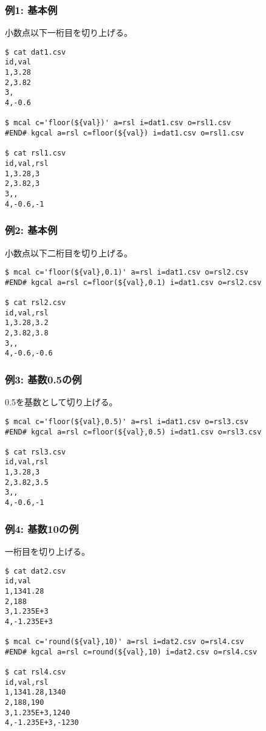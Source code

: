 
\subsubsection*{例1: 基本例}

小数点以下一桁目を切り上げる。

\begin{Verbatim}[baselinestretch=0.7,frame=single]
$ cat dat1.csv
id,val
1,3.28
2,3.82
3,
4,-0.6

$ mcal c='floor(${val})' a=rsl i=dat1.csv o=rsl1.csv
#END# kgcal a=rsl c=floor(${val}) i=dat1.csv o=rsl1.csv

$ cat rsl1.csv
id,val,rsl
1,3.28,3
2,3.82,3
3,,
4,-0.6,-1
\end{Verbatim}

\subsubsection*{例2: 基本例}

小数点以下二桁目を切り上げる。

\begin{Verbatim}[baselinestretch=0.7,frame=single]
$ mcal c='floor(${val},0.1)' a=rsl i=dat1.csv o=rsl2.csv
#END# kgcal a=rsl c=floor(${val},0.1) i=dat1.csv o=rsl2.csv

$ cat rsl2.csv
id,val,rsl
1,3.28,3.2
2,3.82,3.8
3,,
4,-0.6,-0.6
\end{Verbatim}

\subsubsection*{例3: 基数0.5の例}

0.5を基数として切り上げる。

\begin{Verbatim}[baselinestretch=0.7,frame=single]
$ mcal c='floor(${val},0.5)' a=rsl i=dat1.csv o=rsl3.csv
#END# kgcal a=rsl c=floor(${val},0.5) i=dat1.csv o=rsl3.csv

$ cat rsl3.csv
id,val,rsl
1,3.28,3
2,3.82,3.5
3,,
4,-0.6,-1
\end{Verbatim}

\subsubsection*{例4: 基数10の例}

一桁目を切り上げる。

\begin{Verbatim}[baselinestretch=0.7,frame=single]
$ cat dat2.csv
id,val
1,1341.28
2,188
3,1.235E+3
4,-1.235E+3

$ mcal c='round(${val},10)' a=rsl i=dat2.csv o=rsl4.csv
#END# kgcal a=rsl c=round(${val},10) i=dat2.csv o=rsl4.csv

$ cat rsl4.csv
id,val,rsl
1,1341.28,1340
2,188,190
3,1.235E+3,1240
4,-1.235E+3,-1230
\end{Verbatim}

